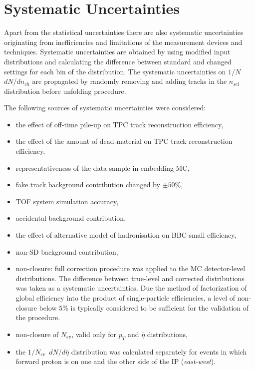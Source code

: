 \section{Systematic Uncertainties}\label{section:star_systematics}
Apart from the statistical uncertainties there are also systematic uncertainties originating from inefficiencies and limitations of the measurement devices and techniques. 
Systematic uncertainties are obtained by using modified input distributions and calculating the difference between standard and changed settings for each bin of the distribution. The systematic uncertainties on $1/N$~$dN/dn_{ch}$ are propagated by randomly removing and adding tracks in the $n_{sel}$ distribution before  unfolding procedure.

The following sources of systematic uncertainties were considered:
\begin{itemize}
	\item the effect of off-time pile-up on TPC track reconstruction efficiency,
	\item the effect of the amount of dead-material on TPC track reconstruction efficiency,
	\item representativeness of the data sample in embedding MC,
	\item fake track background contribution changed by $\pm 50\%$,
	\item TOF system simulation accuracy,
	\item accidental background contribution, 
	\item the effect of alternative model of hadronisation on BBC-small efficiency,
	\item non-SD background contribution,
	\item non-closure: full correction procedure was applied to the MC detector-level distributions. The difference between true-level and corrected distributions was taken as a systematic uncertainties. Due the method of factorization of global efficiency into the product of single-particle efficiencies, a level of non-closure below $5\%$ is typically considered to be sufficient for the validation of the procedure.
	\item non-closure of $N_{ev}$, valid only for $p_T$ and $\bar{\eta}$ distributions,
	\item the $1/N_{ev}$~$dN/d\bar{\eta}$ distribution was calculated separately for events in which forward proton is on one and the other side of the IP (\textit{east-west}).
\end{itemize}
